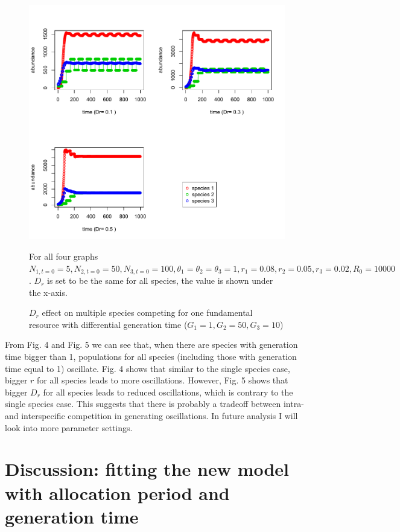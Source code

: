 \documentclass[12pt]{article}
\begin{document}
\begin{figure}
 \includegraphics[width=\textwidth]{oscillation_Dreffect.pdf}
 \caption{$D_r$ effect on multiple species competing for one fundamental resource with differential generation time ($G_1=1, G_2=50, G_3=10$)}
For all four graphs $ N_{1,t=0}=5, N_{2,t=0}=50,N_{3,t=0}=100, \theta_1=\theta_2=\theta_3=1, r_1=0.08, r_2 =0.05, r_3= 0.02, R_0=10000$. $D_r$ is set to be the same for all species, the value is shown under the x-axis.
\end{figure}

From Fig. 4 and Fig. 5 we can see that, when there are species with generation time bigger than 1, populations for all species (including those with generation time equal to 1) oscillate. Fig. 4 shows that similar to the single species case, bigger $r$ for all species leads to more oscillations. However, Fig. 5 shows that bigger $D_r$ for all species leads to reduced oscillations, which is contrary to the single species case. This suggests that there is probably a tradeoff between intra- and interspecific competition in generating oscillations. In future analysis I will look into more parameter settings.

\section{Discussion: fitting the new model with allocation period and generation time}
\end{document}
